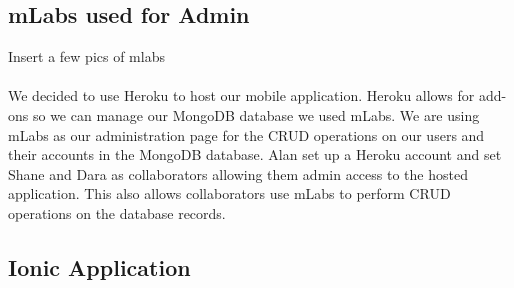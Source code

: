 \subsection{mLabs used for Admin}
Insert a few pics of mlabs\paragraph{}
We decided to use Heroku to host our mobile application. Heroku allows for add-ons so we can manage our MongoDB database we used mLabs. We are using mLabs as our administration page for the CRUD operations on our users and their accounts in the MongoDB database. Alan set up a Heroku account and set Shane and Dara as collaborators allowing them admin access to the hosted application. This also allows collaborators use mLabs to perform CRUD operations on the database records.


\subsection{Ionic Application}

